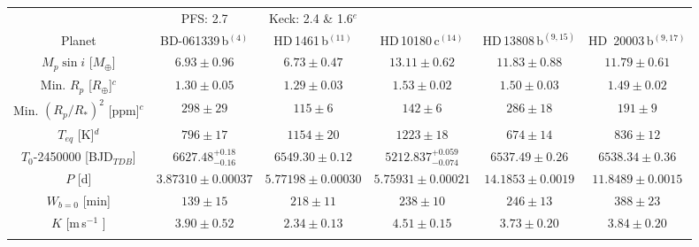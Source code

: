 \documentclass[traditabstract]{aa}
\newcommand{\ms}{\mbox{m\,s$^{-1}$} }
\begin{document}
\begin{appendix}
\begin{table*}
\begin{center}
{\begin{tabular}{cccccc}
                                            & PFS: 2.7                               & Keck: 2.4 \& 1.6$^e$            &                                              &                                                        &    \\ \noalign {\smallskip} 
\hline \noalign {\smallskip}                                           
Planet                                  & BD-061339\,b$^{(4)}$             &    HD\,1461\,b$^{(11)}$        & HD\,10180\,c$^{(14)}$          &  HD\,13808\,b$^{(9, 15)}$                  & HD\, 20003\,b$^{(9, 17)}$  \\ \noalign {\smallskip}
\hline \noalign {\smallskip}
$M_p \sin{i}$ [$M_\oplus$]    & $6.93 \pm 0.96   $               & $6.73 \pm 0.47$                 & $13.11 \pm 0.62$                 &  $11.83 \pm 0.88$                            &$11.79 \pm 0.61$ \\ \noalign {\smallskip} 
Min. $R_p$ [$R_{\oplus}$]$^c$     &  $1.30 \pm 0.05$         & $1.29 \pm 0.03$                  & $1.53 \pm 0.02$                  &   $1.50 \pm 0.03$                            & $1.49 \pm 0.02$  \\ \noalign {\smallskip} 
Min. $(R_p/R_\ast)^2$ [ppm]$^c$ & $298 \pm 29$              & $115 \pm  6$                       & $142 \pm 6$                        &  $ 286 \pm 18$                                &  $191 \pm 9$      \\ \noalign {\smallskip} 
 $T_{eq}$ [K]$^d$                  & $796 \pm 17$                     & $1154 \pm 20$                    & $1223 \pm 18$                    &   $674 \pm 14$                                 &   $836 \pm 12$         \\ \noalign  {\smallskip} 
$T_{0}$-2450000 [BJD$_{TDB}$]         & $6627.48_{-0.16}^{+0.18}$     & $6549.30 \pm 0.12$        & $5212.837_{-0.074}^{+0.059}$  & $6537.49 \pm 0.26$  &  $6538.34 \pm 0.36$   \\ \noalign {\smallskip}     
 $P$ [d]                                   & $3.87310 \pm 0.00037$     & $5.77198 \pm 0.00030$      & $5.75931 \pm 0.00021$      & $14.1853 \pm 0.0019$                    &  $11.8489 \pm 0.0015$ \\ \noalign {\smallskip} 
$W_{b=0}$ [min]                     & $139 \pm 15$                     & $218 \pm 11$                        &$238 \pm 10$                     & $246 \pm 13$                                  &  $388 \pm 23$ \\ \noalign {\smallskip} 
 $K$ [\ms]                               & $3.90 \pm 0.52$                 & $2.34 \pm 0.13$                  & $4.51 \pm 0.15$                  &  $3.73 \pm 0.20$                             &   $3.84 \pm 0.20$    \\ \noalign {\smallskip} 

\end{tabular}}
\end{center}
\end{table*}
\end{appendix}
\end{document}
